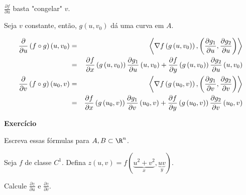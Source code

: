 \documentclass[11pt, oneside, a4paper]{gsm-l}
\begin{document}
\begin{dem}


$\frac{{\partial f}}{{\partial u}}$ basta "congelar" $v$.

Seja $v$ constante, então, $g\left( {u,v_0 } \right)$ dá uma curva em $A$.

\begin{eqnarray*}
\frac{\partial }
{{\partial u}}\left( {f \circ g} \right)\left( {u,v_0 } \right) &=& \left\langle {\nabla f\left( {g\left( {u,v_0 } \right)} \right),\left( {\frac{{\partial g_1 }}
{{\partial u}},\frac{{\partial g_2 }}
{{\partial u}}} \right)} \right\rangle  \hfill \\
&=& \frac{{\partial f}}
{{\partial x}}\left( {g\left( {u,v_0 } \right)} \right)\frac{{\partial g_1 }}
{{\partial u}}\left( {u,v_0 } \right) + \frac{{\partial f}}
{{\partial y}}\left( {g\left( {u,v_0 } \right)} \right)\frac{{\partial g_2 }}
{{\partial u}}\left( {u,v_0 } \right) \hfill \\
\frac{\partial }
{{\partial v}}\left( {f \circ g} \right)\left( {u_0 ,v} \right) &=& \left\langle {\nabla f\left( {g\left( {u_0 ,v} \right)} \right),\left( {\frac{{\partial g_1 }}
{{\partial v}},\frac{{\partial g_2 }}
{{\partial v}}} \right)} \right\rangle  \hfill \\
&=& \frac{{\partial f}}
{{\partial x}}\left( {g\left( {u_0 ,v} \right)} \right)\frac{{\partial g_1 }}
{{\partial v}}\left( {u_0 ,v} \right) + \frac{{\partial f}}
{{\partial y}}\left( {g\left( {u_0 ,v} \right)} \right)\frac{{\partial g_2 }}
{{\partial v}}\left( {u_0 ,v} \right) \hfill \\
\end{eqnarray*}

\end{dem}

\textbf{Exercício}

\begin{exer}
Escreva essas f\'ormulas para $A,B \subset \R^n$.
\end{exer}

\begin{exem}
Seja $f$ de classe $C^1$. Defina $z\left( {u,v} \right) = f\left( {\underbrace {u^2  + v^2 }_x,\underbrace {uv}_y} \right)$.

Calcule $\frac{{\partial z}}{{\partial u}}$ e $\frac{{\partial z}}{{\partial v}}$.
\end{exem}
\end{document}
